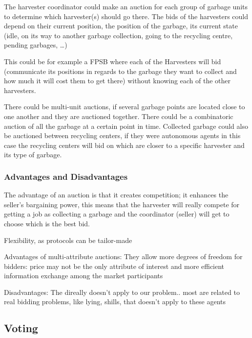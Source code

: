 The harvester coordinator could make an auction for each group of garbage units to determine which harvester(s) should go there. The bids of the harvesters could depend on their current position, the position of the garbage, its current state (idle, on its way to another garbage collection, going to the recycling centre, pending garbages, …)

This could be for example a FPSB where each of the Harvesters will bid (communicate its positions in regards to the garbage they want to  collect and how much it will cost them to get there) without knowing each of the other harvesters.

There could be multi-unit auctions, if several garbage points are located close to one another and they are auctioned together.
There could be a combinatoric auction of all the garbage at a certain point in time.
Collected garbage could also be auctioned between recycling centers, if they were autonomous agents in this case the recycling centers will bid on which are closer to a specific harvester and its type of garbage.

\subsubsection{Advantages and Disadvantages}

The advantage of an auction is that it creates competition; it enhances the seller’s bargaining power, this means that the harvester will really compete for getting a job as collecting a garbage and the coordinator (seller) will get to choose which is the best bid.

Flexibility, as protocols can be tailor-made

Advantages of multi-attribute auctions: They allow more degrees of freedom for bidders: price may not be the only attribute of interest and more efficient information exchange among the market participants

Disadvantages:
The direally doesn't apply to our problem.. most are related to real bidding problems, like lying, shills, that doesn't apply to these agents



\subsection{Voting}

